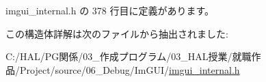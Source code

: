  imgui\+\_\+internal.\+h の 378 行目に定義があります。



この構造体詳解は次のファイルから抽出されました\+:\begin{DoxyCompactItemize}
\item 
C\+:/\+H\+A\+L/\+P\+G関係/03\+\_\+作成プログラム/03\+\_\+\+H\+A\+L授業/就職作品/\+Project/source/06\+\_\+\+Debug/\+Im\+G\+U\+I/\mbox{\hyperlink{imgui__internal_8h}{imgui\+\_\+internal.\+h}}\end{DoxyCompactItemize}
